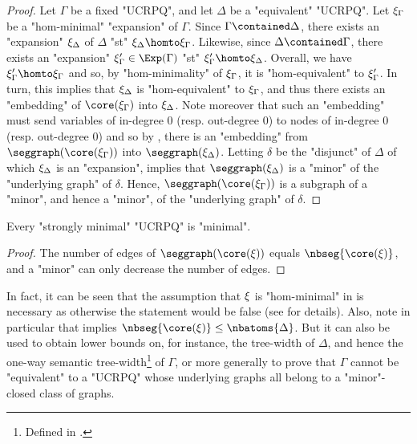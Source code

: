 \begin{proof}
	Let $\Gamma$ be a fixed "UCRPQ", and let $\Delta$ be a "equivalent" "UCRPQ".
	Let $\xi_\Gamma$ be a "hom-minimal" "expansion" of $\Gamma$.
	Since $\Gamma \contained \Delta$, there exists an "expansion" $\xi_\Delta$ of $\Delta$
	"st" $\anexpansion_\Delta \homto \anexpansion_\Gamma$. Likewise, since $\Delta \contained \Gamma$, there exists an "expansion" $\anexpansion'_\Gamma \in \Exp(\Gamma)$ "st"
	$\anexpansion'_\Gamma \homto \anexpansion_\Delta$. Overall, we have
	$\anexpansion'_\Gamma \homto \anexpansion_\Gamma$ and so,
	by "hom-minimality" of $\xi_\Gamma$, it is "hom-equivalent" to $\xi'_\Gamma$. In turn, this implies that $\xi_\Delta$ is "hom-equivalent" to $\xi_\Gamma$, 
	and thus there exists an "embedding" of
	$\core(\anexpansion_\Gamma)$ into $\xi_\Delta$.
	Note moreover that such an "embedding" must send variables of
	in-degree 0 (resp. out-degree 0) to nodes of in-degree 0 (resp. out-degree 0)
	and so by ,
	there is an "embedding" from $\seggraph(\core(\anexpansion_\Gamma))$
	into $\seggraph(\anexpansion_\Delta)$.
	Letting $\delta$ be the "disjunct" of $\Delta$ of which $\xi_\Delta$ is an "expansion",
	 implies that $\seggraph(\anexpansion_\Delta)$ is a
	"minor" of the "underlying graph" of $\delta$.
	Hence, $\seggraph(\core(\anexpansion_\Gamma))$ is a subgraph of a "minor", and hence a "minor", of the "underlying graph" of $\delta$.
\end{proof}

\begin{corollary}
	\AP\label{coro:strong-min}
	Every "strongly minimal" "UCRPQ" is "minimal".
\end{corollary}

\begin{proof}
	The number of edges of $\seggraph(\core(\anexpansion))$ equals $\nbseg{\core(\anexpansion)}$, and a "minor" can only decrease the number of edges.
\end{proof}

In fact, it can be seen that the assumption that $\xi$ is "hom-minimal" in
 is necessary as otherwise the statement would be false (see  for details).
%
Also, note in particular that  implies
$\nbseg{\core(\anexpansion)} \leq \nbatoms{\Delta}$. 
But it can also be used to obtain lower bounds on, for instance,
the tree-width of $\Delta$, and hence the one-way semantic tree-width\footnote{Defined in
\cite[\S 1, p. 7]{FigueiraMorvan2025SemanticTreeWidthLMCS}.} of $\Gamma$, 
or more generally to prove that $\Gamma$ cannot be "equivalent" to a "UCRPQ" whose
underlying graphs all belong to a "minor"-closed class of graphs.

